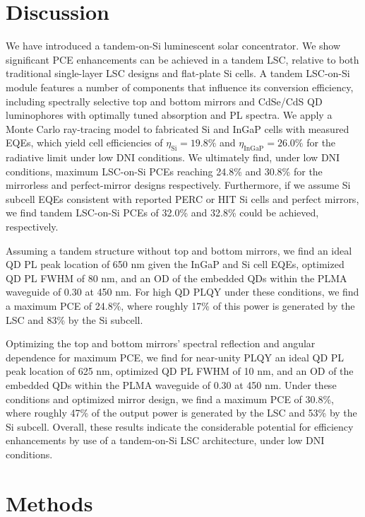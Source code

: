 \documentclass[conference]{./pvsctran}
\begin{document}
		\section*{Discussion}
		
		We have introduced a tandem-on-Si luminescent solar concentrator.  We show significant PCE enhancements can be achieved in a tandem LSC, relative to both traditional single-layer LSC designs and flat-plate Si cells. A tandem LSC-on-Si module features a number of components that influence its conversion efficiency, including spectrally selective top and bottom mirrors and CdSe/CdS QD luminophores with optimally tuned absorption and PL spectra. We apply a Monte Carlo ray-tracing model to fabricated Si and InGaP cells with measured EQEs, which yield cell efficiencies of $\eta_\text{Si} = 19.8\%$ and $\eta_\text{InGaP} = 26.0\%$ for the radiative limit under low DNI conditions. We ultimately find, under low DNI conditions, maximum LSC-on-Si PCEs reaching 24.8\% and 30.8\% for the mirrorless and perfect-mirror designs respectively. Furthermore, if we assume Si subcell EQEs consistent with reported PERC \cite{Masuko2014} or HIT \cite{Padmanabhan2016} Si cells and perfect mirrors, we find tandem LSC-on-Si PCEs of 32.0\% and 32.8\% could be achieved, respectively.
		
		Assuming a tandem structure without top and bottom mirrors, we find an ideal QD PL peak location of 650 nm given the InGaP and Si cell EQEs, optimized QD PL FWHM of 80 nm, and an OD of the embedded QDs within the PLMA waveguide of 0.30 at 450 nm. For high QD PLQY under these conditions, we find a maximum PCE of 24.8\%, where roughly 17\% of this power is generated by the LSC and 83\% by the Si subcell. 
		
		Optimizing the top and bottom mirrors’ spectral reflection and angular dependence for maximum PCE, we find for near-unity PLQY an ideal QD PL peak location of 625 nm, optimized QD PL FWHM of 10 nm, and an OD of the embedded QDs within the PLMA waveguide of 0.30 at 450 nm. Under these conditions and optimized mirror design, we find a maximum PCE of 30.8\%, where roughly 47\% of the output power is generated by the LSC and 53\% by the Si subcell. Overall, these results indicate the considerable potential for efficiency enhancements by use of a tandem-on-Si LSC architecture, under low DNI conditions. 
	
		\section*{Methods}
		
\end{document}
